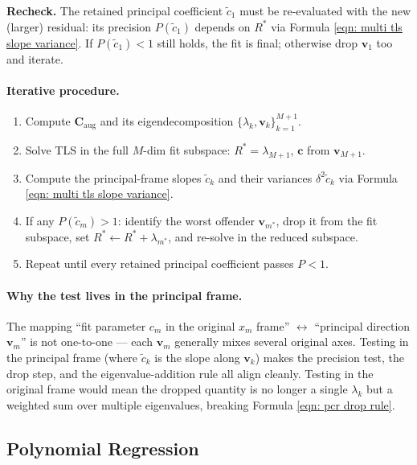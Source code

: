 \documentclass[twoside]{article}
\numberwithin{equation}{section}
\begin{document}
\textbf{Recheck.} The retained principal coefficient $\tilde{c}_1$ must be re-evaluated with the new (larger) residual: its precision $P(\tilde{c}_1)$ depends on $R^*$ via Formula \eqref{eqn: multi tls slope variance}. If $P(\tilde{c}_1) < 1$ still holds, the fit is final; otherwise drop $\mathbf{v}_1$ too and iterate.

\paragraph{Iterative procedure.}
\begin{enumerate}
\item Compute $\mathbf{C}_{\mathrm{aug}}$ and its eigendecomposition $\{\lambda_k, \mathbf{v}_k\}_{k=1}^{M+1}$.
\item Solve TLS in the full $M$-dim fit subspace: $R^* = \lambda_{M+1}$, $\mathbf{c}$ from $\mathbf{v}_{M+1}$.
\item Compute the principal-frame slopes $\tilde{c}_k$ and their variances $\delta^2 \tilde{c}_k$ via Formula \eqref{eqn: multi tls slope variance}.
\item If any $P(\tilde{c}_m) > 1$: identify the worst offender $\mathbf{v}_{m^*}$, drop it from the fit subspace, set $R^* \leftarrow R^* + \lambda_{m^*}$, and re-solve in the reduced subspace.
\item Repeat until every retained principal coefficient passes $P < 1$.
\end{enumerate}

\paragraph{Why the test lives in the principal frame.}
The mapping ``fit parameter $c_m$ in the original $x_m$ frame'' $\leftrightarrow$ ``principal direction $\mathbf{v}_m$'' is not one-to-one --- each $\mathbf{v}_m$ generally mixes several original axes. Testing in the principal frame (where $\tilde{c}_k$ is the slope along $\mathbf{v}_k$) makes the precision test, the drop step, and the eigenvalue-addition rule all align cleanly. Testing in the original frame would mean the dropped quantity is no longer a single $\lambda_k$ but a weighted sum over multiple eigenvalues, breaking Formula \eqref{eqn: pcr drop rule}.


\subsection{Polynomial Regression}
\end{document}
